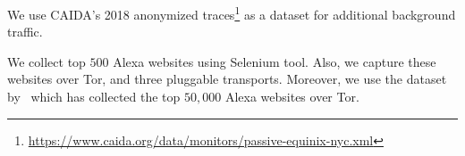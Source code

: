 We use CAIDA's 2018 anonymized traces\footnote{\url{https://www.caida.org/data/monitors/passive-equinix-nyc.xml}} as a dataset for additional background traffic. 

We collect top $500$ Alexa websites using Selenium tool. Also, we capture these websites over Tor, and three pluggable transports. Moreover, we use 
the dataset by~\cite{deepcore} which has collected the top $50,000$ Alexa websites over Tor. 

